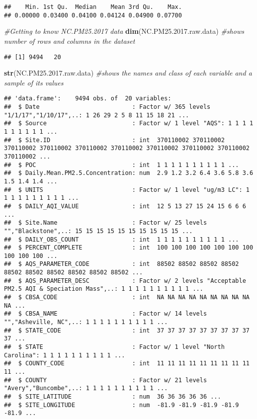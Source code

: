 \documentclass[]{article}
\newenvironment{Shaded}{\begin{snugshade}}{\end{snugshade}}
\newcommand{\KeywordTok}[1]{\textcolor[rgb]{0.13,0.29,0.53}{\textbf{#1}}}
\newcommand{\FloatTok}[1]{\textcolor[rgb]{0.00,0.00,0.81}{#1}}
\newcommand{\CommentTok}[1]{\textcolor[rgb]{0.56,0.35,0.01}{\textit{#1}}}
\newcommand{\NormalTok}[1]{#1}
\begin{document}
\begin{verbatim}
##    Min. 1st Qu.  Median    Mean 3rd Qu.    Max. 
## 0.00000 0.03400 0.04100 0.04124 0.04900 0.07700
\end{verbatim}

\begin{Shaded}
\begin{Highlighting}[]
\CommentTok{#Getting to know NC.PM25.2017 data}
\KeywordTok{dim}\NormalTok{(NC.PM25.}\FloatTok{2017.}\NormalTok{raw.data) }\CommentTok{#shows number of rows and columns in the dataset}
\end{Highlighting}
\end{Shaded}

\begin{verbatim}
## [1] 9494   20
\end{verbatim}

\begin{Shaded}
\begin{Highlighting}[]
\KeywordTok{str}\NormalTok{(NC.PM25.}\FloatTok{2017.}\NormalTok{raw.data) }\CommentTok{#shows the names and class of each variable and a sample of its values}
\end{Highlighting}
\end{Shaded}

\begin{verbatim}
## 'data.frame':    9494 obs. of  20 variables:
##  $ Date                          : Factor w/ 365 levels "1/1/17","1/10/17",..: 1 26 29 2 5 8 11 15 18 21 ...
##  $ Source                        : Factor w/ 1 level "AQS": 1 1 1 1 1 1 1 1 1 1 ...
##  $ Site.ID                       : int  370110002 370110002 370110002 370110002 370110002 370110002 370110002 370110002 370110002 370110002 ...
##  $ POC                           : int  1 1 1 1 1 1 1 1 1 1 ...
##  $ Daily.Mean.PM2.5.Concentration: num  2.9 1.2 3.2 6.4 3.6 5.8 3.6 1.5 1.4 1.4 ...
##  $ UNITS                         : Factor w/ 1 level "ug/m3 LC": 1 1 1 1 1 1 1 1 1 1 ...
##  $ DAILY_AQI_VALUE               : int  12 5 13 27 15 24 15 6 6 6 ...
##  $ Site.Name                     : Factor w/ 25 levels "","Blackstone",..: 15 15 15 15 15 15 15 15 15 15 ...
##  $ DAILY_OBS_COUNT               : int  1 1 1 1 1 1 1 1 1 1 ...
##  $ PERCENT_COMPLETE              : int  100 100 100 100 100 100 100 100 100 100 ...
##  $ AQS_PARAMETER_CODE            : int  88502 88502 88502 88502 88502 88502 88502 88502 88502 88502 ...
##  $ AQS_PARAMETER_DESC            : Factor w/ 2 levels "Acceptable PM2.5 AQI & Speciation Mass",..: 1 1 1 1 1 1 1 1 1 1 ...
##  $ CBSA_CODE                     : int  NA NA NA NA NA NA NA NA NA NA ...
##  $ CBSA_NAME                     : Factor w/ 14 levels "","Asheville, NC",..: 1 1 1 1 1 1 1 1 1 1 ...
##  $ STATE_CODE                    : int  37 37 37 37 37 37 37 37 37 37 ...
##  $ STATE                         : Factor w/ 1 level "North Carolina": 1 1 1 1 1 1 1 1 1 1 ...
##  $ COUNTY_CODE                   : int  11 11 11 11 11 11 11 11 11 11 ...
##  $ COUNTY                        : Factor w/ 21 levels "Avery","Buncombe",..: 1 1 1 1 1 1 1 1 1 1 ...
##  $ SITE_LATITUDE                 : num  36 36 36 36 36 ...
##  $ SITE_LONGITUDE                : num  -81.9 -81.9 -81.9 -81.9 -81.9 ...
\end{verbatim}
\end{document}

